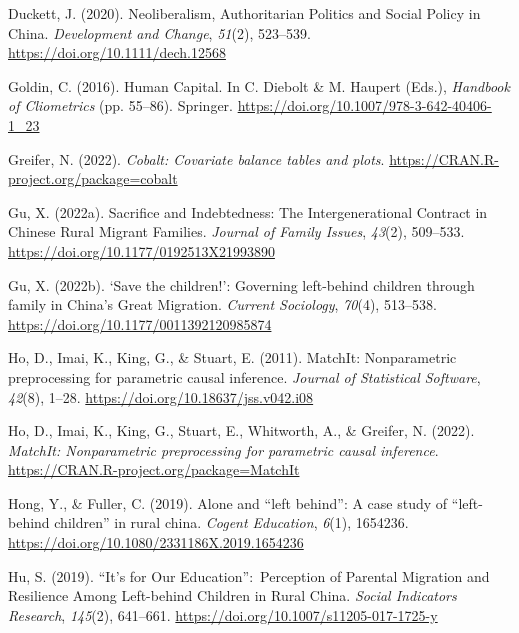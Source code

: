 \documentclass[
  man,floatsintext]{apa7}
\newlength{\cslhangindent}
\newlength{\cslentryspacingunit} %
\newenvironment{CSLReferences}[2] %
 {%
  \setlength{\parindent}{0pt}
  \ifodd #1
  \let\oldpar\par
  \def\par{\hangindent=\cslhangindent\oldpar}
  \fi
  \setlength{\parskip}{#2\cslentryspacingunit}
 }%
 {}
\begin{document}
\begin{CSLReferences}{1}{0}
\leavevmode{}%
Duckett, J. (2020). Neoliberalism, Authoritarian Politics and Social Policy in China. \emph{Development and Change}, \emph{51}(2), 523--539. \url{https://doi.org/10.1111/dech.12568}

\leavevmode{}%
Goldin, C. (2016). Human Capital. In C. Diebolt \& M. Haupert (Eds.), \emph{Handbook of Cliometrics} (pp. 55--86). Springer. \url{https://doi.org/10.1007/978-3-642-40406-1_23}

\leavevmode{}%
Greifer, N. (2022). \emph{Cobalt: Covariate balance tables and plots}. \url{https://CRAN.R-project.org/package=cobalt}

\leavevmode{}%
Gu, X. (2022a). Sacrifice and Indebtedness: The Intergenerational Contract in Chinese Rural Migrant Families. \emph{Journal of Family Issues}, \emph{43}(2), 509--533. \url{https://doi.org/10.1177/0192513X21993890}

\leavevmode{}%
Gu, X. (2022b). {`}Save the children!{'}: Governing left-behind children through family in China{'}s Great Migration. \emph{Current Sociology}, \emph{70}(4), 513--538. \url{https://doi.org/10.1177/0011392120985874}

\leavevmode{}%
Ho, D., Imai, K., King, G., \& Stuart, E. (2011). {MatchIt}: Nonparametric preprocessing for parametric causal inference. \emph{Journal of Statistical Software}, \emph{42}(8), 1--28. \url{https://doi.org/10.18637/jss.v042.i08}

\leavevmode{}%
Ho, D., Imai, K., King, G., Stuart, E., Whitworth, A., \& Greifer, N. (2022). \emph{MatchIt: Nonparametric preprocessing for parametric causal inference}. \url{https://CRAN.R-project.org/package=MatchIt}

\leavevmode{}%
Hong, Y., \& Fuller, C. (2019). Alone and {``}left behind{''}: A case study of {``}left-behind children{''} in rural china. \emph{Cogent Education}, \emph{6}(1), 1654236. \url{https://doi.org/10.1080/2331186X.2019.1654236}

\leavevmode{}%
Hu, S. (2019). {``}It{'}s for Our Education{''}:~Perception of Parental Migration and Resilience Among Left-behind Children in Rural China. \emph{Social Indicators Research}, \emph{145}(2), 641--661. \url{https://doi.org/10.1007/s11205-017-1725-y}


\end{CSLReferences}
\end{document}
